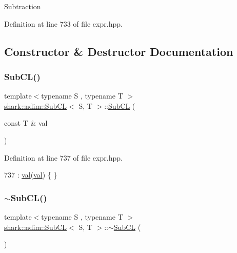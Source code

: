 Subtraction 

Definition at line 733 of file expr.\+hpp.



\subsection{Constructor \& Destructor Documentation}
\hypertarget{classshark_1_1ndim_1_1_sub_c_l_aa164454d7bffa3ef34f998e66458c2c5}{}\label{classshark_1_1ndim_1_1_sub_c_l_aa164454d7bffa3ef34f998e66458c2c5} 
\subsubsection{\texorpdfstring{Sub\+C\+L()}{SubCL()}}
{\footnotesize\ttfamily template$<$typename S , typename T $>$ \\
\hyperlink{classshark_1_1ndim_1_1_sub_c_l}{shark\+::ndim\+::\+Sub\+CL}$<$ S, T $>$\+::\hyperlink{classshark_1_1ndim_1_1_sub_c_l}{Sub\+CL} (\begin{DoxyParamCaption}\item[{const T \&}]{val }\end{DoxyParamCaption})\hspace{0.3cm}{\ttfamily [inline]}}



Definition at line 737 of file expr.\+hpp.


\begin{DoxyCode}
737 : \hyperlink{classshark_1_1ndim_1_1_sub_c_l_af7420c474cd5adcbbe5672cbef936654}{val}(\hyperlink{classshark_1_1ndim_1_1_sub_c_l_af7420c474cd5adcbbe5672cbef936654}{val}) \{ \}
\end{DoxyCode}
\hypertarget{classshark_1_1ndim_1_1_sub_c_l_a8b91fe23f2e54765aee66bc8f74f9385}{}\label{classshark_1_1ndim_1_1_sub_c_l_a8b91fe23f2e54765aee66bc8f74f9385} 
\subsubsection{\texorpdfstring{$\sim$\+Sub\+C\+L()}{~SubCL()}}
{\footnotesize\ttfamily template$<$typename S , typename T $>$ \\
\hyperlink{classshark_1_1ndim_1_1_sub_c_l}{shark\+::ndim\+::\+Sub\+CL}$<$ S, T $>$\+::$\sim$\hyperlink{classshark_1_1ndim_1_1_sub_c_l}{Sub\+CL} (\begin{DoxyParamCaption}{ }\end{DoxyParamCaption})\hspace{0.3cm}{\ttfamily [inline]}}



